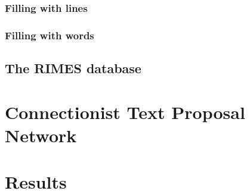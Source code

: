 
		\subsubsection{Filling with lines}


		\subsubsection{Filling with words}



	\subsection{The RIMES database}




\section{Connectionist Text Proposal Network}\label{sec:ctpn}





\section{Results}\label{sec:detection_results}


